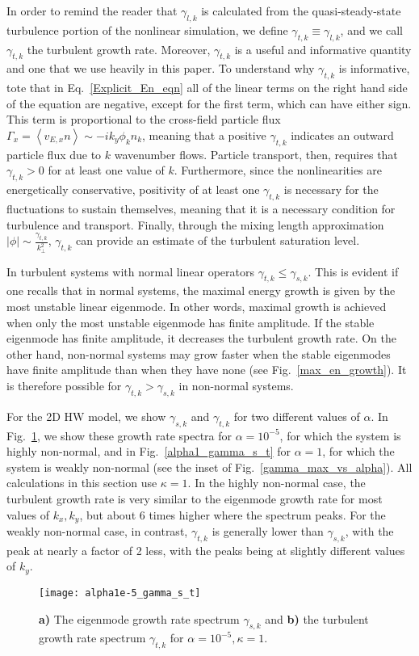 \documentclass[twocolumn,showkeys,superscriptaddress]{revtex4}
\begin{document}
In order to remind the reader that $\gamma_{l,k}$ is calculated from the quasi-steady-state turbulence portion of the nonlinear simulation, we define $\gamma_{t,k} \equiv \gamma_{l,k}$, 
and we call $\gamma_{t,k}$ the turbulent growth rate. Moreover, $\gamma_{t,k}$ is a useful and informative quantity and one that we use heavily in this paper.
To understand why $\gamma_{t,k}$ is informative, tote that in Eq.~\ref{Explicit_En_eqn} all of the linear terms on the right hand side of the equation are negative, except for the first term, which can have either sign. 
This term is proportional to the cross-field particle flux $\Gamma_x = \left< v_{E,x} n \right> \sim -i k_y \phi_k n_k$, meaning that a positive $\gamma_{t,k}$ indicates an outward particle flux
due to $k$ wavenumber flows. Particle transport, then, requires that $\gamma_{t,k} > 0$ for at least one value of $k$. Furthermore, since the nonlinearities are energetically conservative,
positivity of at least one $\gamma_{t,k}$ is necessary for the fluctuations to sustain themselves, meaning that it is a necessary condition for turbulence and transport. 
Finally, through the mixing length approximation $|\phi| \sim \frac{\gamma_{t,k}}{k_\perp^2}$, $\gamma_{t,k}$ can provide an estimate of the turbulent saturation level.

In turbulent systems with normal linear operators $\gamma_{t,k} \le \gamma_{s,k}$. This is evident if one recalls that in normal systems, the maximal
energy growth is given by the most unstable linear eigenmode. In other words, maximal growth is achieved when only the most unstable eigenmode has finite amplitude.
If the stable eigenmode has finite amplitude, it decreases the turbulent growth rate.
On the other hand, non-normal systems may grow faster when the stable eigenmodes have finite amplitude than when they have none (see Fig.~\ref{max_en_growth}). 
It is therefore possible for $\gamma_{t,k} > \gamma_{s,k}$ in non-normal systems.

For the 2D HW model, we show
$\gamma_{s,k}$ and $\gamma_{t,k}$ for two different values of $\alpha$. In Fig.~\ref{alpha1e-5_gamma_s_t}, we show these growth rate spectra for $\alpha = 10^{-5}$, for which the system is
highly non-normal, and in Fig.~\ref{alpha1_gamma_s_t} for $\alpha = 1$, for which the system is weakly non-normal (see the inset of Fig.~\ref{gamma_max_vs_alpha}). All calculations in this section use $\kappa=1$. 
In the highly non-normal case, the turbulent growth rate is very similar to the eigenmode growth rate for most values of $k_x,k_y$, but about 6 times higher where the spectrum peaks. For the weakly non-normal
case, in contrast, $\gamma_{t,k}$ is generally lower than $\gamma_{s,k}$, with the peak at nearly a factor of 2 less, with the peaks being at slightly different values of $k_y$.
\begin{figure}
\centerline{\texttt{[image: alpha1e-5\_gamma\_s\_t]}}
\caption{{\bf a)} The eigenmode growth rate spectrum $\gamma_{s,k}$ and {\bf b)} the turbulent growth rate spectrum $\gamma_{t,k}$ for $\alpha = 10^{-5}, \kappa=1$.}
\label{alpha1e-5_gamma_s_t}
\end{figure}
\end{document}
